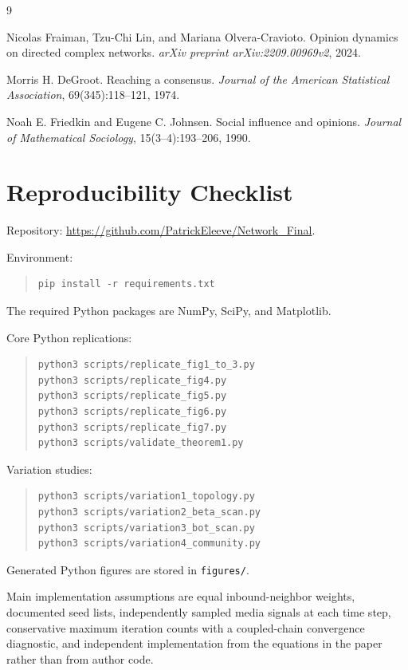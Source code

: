 \documentclass[11pt]{article}
\begin{document}
\begin{thebibliography}{9}

Nicolas Fraiman, Tzu-Chi Lin, and Mariana Olvera-Cravioto.
\newblock Opinion dynamics on directed complex networks.
\newblock \emph{arXiv preprint arXiv:2209.00969v2}, 2024.

Morris H. DeGroot.
\newblock Reaching a consensus.
\newblock \emph{Journal of the American Statistical Association},
69(345):118--121, 1974.

Noah E. Friedkin and Eugene C. Johnsen.
\newblock Social influence and opinions.
\newblock \emph{Journal of Mathematical Sociology}, 15(3--4):193--206, 1990.

\end{thebibliography}

\appendix

\section{Reproducibility Checklist}

Repository:
\url{https://github.com/PatrickEleeve/Network_Final}.

Environment:
\begin{quote}
\small
\begin{verbatim}
pip install -r requirements.txt
\end{verbatim}
\end{quote}
The required Python packages are NumPy, SciPy, and Matplotlib.

Core Python replications:
\begin{quote}
\small
\begin{verbatim}
python3 scripts/replicate_fig1_to_3.py
python3 scripts/replicate_fig4.py
python3 scripts/replicate_fig5.py
python3 scripts/replicate_fig6.py
python3 scripts/replicate_fig7.py
python3 scripts/validate_theorem1.py
\end{verbatim}
\end{quote}

Variation studies:
\begin{quote}
\small
\begin{verbatim}
python3 scripts/variation1_topology.py
python3 scripts/variation2_beta_scan.py
python3 scripts/variation3_bot_scan.py
python3 scripts/variation4_community.py
\end{verbatim}
\end{quote}

Generated Python figures are stored in \texttt{figures/}.

Main implementation assumptions are equal inbound-neighbor weights, documented
seed lists, independently sampled media signals at each time step, conservative
maximum iteration counts with a coupled-chain convergence diagnostic, and
independent implementation from the equations in the paper rather than from
author code.
\end{document}
